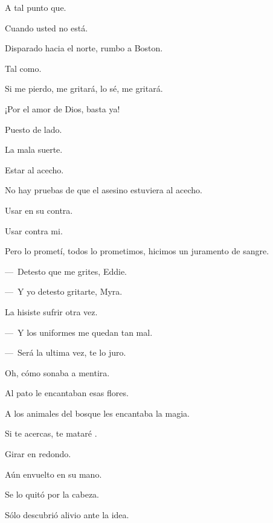 \sk
A tal punto que. 

\sk
Cuando usted no está. 

\sk
Disparado hacia el norte, rumbo a Boston. 

\sk
Tal como. 

\sk
Si me pierdo, me gritará, lo sé, me gritará. 

\sk
¡Por el amor de Dios, basta ya!\nb{}

\sk
Puesto de lado. 

\sk
La mala suerte. 

\sk
Estar al acecho. 

\sk
No hay pruebas de que el asesino estuviera al acecho. 

\sk
Usar en su contra. 

\sk
Usar contra mi. \nb{}

\sk
Pero lo prometí, todos lo prometimos, hicimos un juramento de sangre. 

\sk
---~Detesto que me grites, Eddie.\nb{}

---~Y yo detesto gritarte, Myra.\nb{}

\sk
La hisiste sufrir otra vez. 

\sk
---~Y los uniformes me quedan tan mal.\nb{}

---~Será la ultima vez, te lo juro.\nb{}

\sk
Oh, cómo sonaba a mentira. 

\sk
Al pato le encantaban esas flores.\nb{}

\sk
A los animales del bosque les encantaba la magia.\nb{}

\sk
Si te acercas, te mataré .\nb{}

\sk
Girar en redondo. 

\sk
Aún envuelto en su mano. 

\sk
Se lo quitó por la cabeza. 

\sk
Sólo descubrió alivio ante la idea. 

